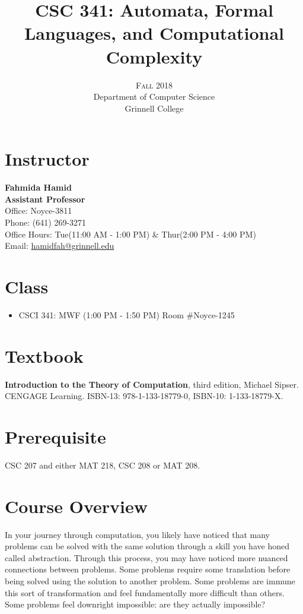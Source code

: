\documentclass[twoside]{article}
\title{CSC 341: Automata, Formal Languages, and Computational Complexity} %
\author{%
\textsc{Fall 2018}\\[1ex] %
Department of Computer Science\\ Grinnell College\\  %
}
\date{} %
\begin{document}
\maketitle


\section{Instructor}

{\bf Fahmida Hamid \\Assistant Professor\\}
Office: Noyce-3811\\
Phone: (641) 269-3271\\
Office Hours: Tue(11:00 AM - 1:00 PM) \& Thur(2:00 PM - 4:00 PM)\\
Email: \href{mailto: hamidfah@grinnell.edu}{ hamidfah@grinnell.edu}

\section{Class}
\begin{itemize}
\item CSCI 341: MWF (1:00 PM - 1:50 PM) {Room \#Noyce-1245}
\end{itemize}

\section{Textbook}
{\bf Introduction to the Theory of Computation}, third edition, Michael Sipser.\\
CENGAGE Learning. ISBN-13: 978-1-133-18779-0, ISBN-10: 1-133-18779-X.

\section{Prerequisite}
 CSC 207 and either MAT 218, CSC 208 or MAT 208. 

\section{Course Overview}
In your journey through computation, you likely have noticed that many problems can be solved with the same solution through a skill you have honed called abstraction. Through this process, you may have noticed more nuanced connections between problems. Some problems require some translation before being solved using the solution to another problem. Some problems are immune this sort of transformation and feel fundamentally more difficult than others. Some problems feel downright impossible: are they actually impossible?
\end{document}
